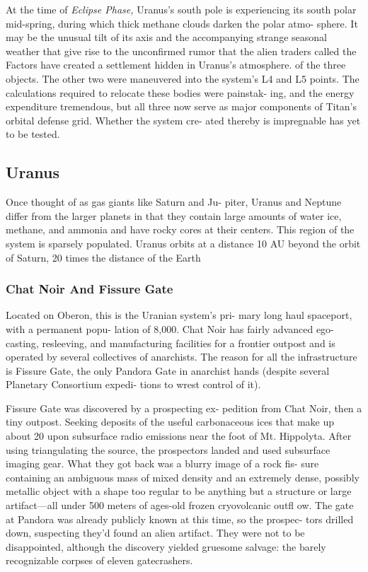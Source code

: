 At the time of \textit{Eclipse Phase,} Uranus's south pole 
is experiencing its south polar mid-spring, during 
which thick methane clouds darken the polar atmo-
sphere. It may be the unusual tilt of its axis and the 
accompanying strange seasonal weather that give 
rise to the unconfirmed rumor that the alien traders 
called the Factors have created a settlement hidden 
in Uranus's atmosphere.
of the three objects. The other two 
were maneuvered into the system's L4
and L5 points. The calculations required
to relocate these  bodies were painstak-
ing, and the energy expenditure tremendous, 
but all three now serve as major components of
Titan's orbital defense grid. Whether the system cre-
ated thereby is impregnable has yet to be tested.

\subsection{Uranus}

Once thought of as gas giants like Saturn and Ju-
piter, Uranus and Neptune differ from the larger
planets in that they contain large amounts of water 
ice, methane, and ammonia and have rocky cores at 
their centers. This region of the system is sparsely
populated. Uranus orbits at a distance 10 AU beyond 
the orbit of Saturn, 20 times the distance of the Earth

\subsubsection{Chat Noir And Fissure Gate}

Located on Oberon, this is the Uranian system's pri-
mary long haul spaceport, with a permanent popu-
lation of 8,000. Chat Noir has fairly advanced ego-
casting, resleeving, and manufacturing facilities for a 
frontier outpost and is operated by several collectives 
of anarchists. The reason for all the infrastructure 
is Fissure Gate, the only Pandora Gate in anarchist 
hands (despite several Planetary Consortium expedi-
tions to wrest control of it).

Fissure Gate was discovered by a prospecting ex-
pedition from Chat Noir, then a tiny outpost. Seeking 
deposits of the useful carbonaceous ices that make up 
about 20%
upon subsurface radio emissions near the foot of Mt. 
Hippolyta. After using triangulating the source, the 
prospectors landed and used subsurface imaging gear. 
What they got back was a blurry image of a rock fis-
sure containing an ambiguous mass of mixed density 
and an extremely dense, possibly metallic object with 
a shape too regular to be anything but a structure 
or large artifact—all under 500 meters of ages-old 
frozen cryovolcanic outfl ow. The gate at Pandora was 
already publicly known at this time, so the prospec-
tors drilled down, suspecting they'd found an alien 
artifact. They were not to be disappointed, although 
the discovery yielded gruesome salvage: the barely 
recognizable corpses of eleven gatecrashers.


